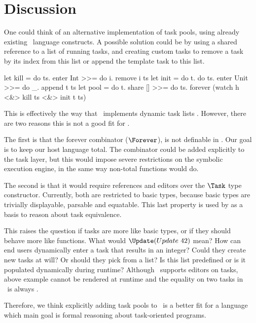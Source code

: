 
\section{Discussion}


One could think of an alternative implementation of task pools,
using already existing \TOPHAT\ language constructs.
A possible solution could be by using a shared reference to a list of running tasks,
and creating custom tasks to remove a task by its index from this list
or append the template task to this list.
\begin{TASK}
  let kill = do ts. enter Int >>= do i. remove i ts
  let init = do t. do ts. enter Unit >>= do _. append t ts
  let pool = do t.
    share [] >>= do ts.
    forever (watch h <&> kill ts <&> init t ts)
\end{TASK}

This is effectively the way that \ITASKS\ implements dynamic task lists \cite{conf/pepm/PlasmeijerAKLNG11}.
However, there are two reasons this is not a good fit for \TOPHAT.

The first is that the forever combinator ($\Forever$), is not definable in \TOPHAT.
Our goal is to keep our host language total.
The combinator could be added explicitly to the task layer,
but this would impose severe restrictions on the symbolic execution engine,
in the same way non-total functions would do.

The second is that it would require references and editors over the $\Task$ type constructor.
Currently, both are restricted to basic types,
because basic types are trivially displayable, parsable and equatable.
This last property is used by \cite{Klijnsma2020} as a basis to reason about task equivalence.

This raises the question if tasks are more like basic types, or if they should behave more like functions.
What would $\Update (Update\ 42)$ mean?
How can end users dynamically enter a task that results in an integer?
Could they create new tasks at will?
Or should they pick from a list?
Is this list predefined or is it populated dynamically during runtime?
Although \ITASKS\ supports editors on tasks,
above example cannot be rendered at runtime and the equality on two tasks in \ITASKS\ is always .

Therefore, we think explicitly adding task pools to \TOPHAT\ is a better fit for a language which main goal is formal reasoning about task-oriented programs.
